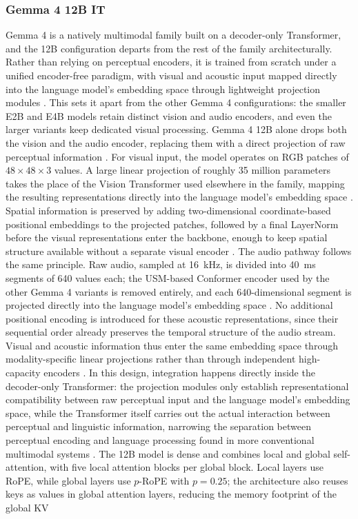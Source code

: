 \subsubsection*{Gemma 4 12B IT}
Gemma 4 is a natively multimodal family built on a decoder-only Transformer, and the 12B configuration departs from the rest of the family architecturally. Rather than relying on perceptual encoders, it is trained from scratch under a unified encoder-free paradigm, with visual and acoustic input mapped directly into the language model's embedding space through lightweight projection modules \cite{gemma4technicalreport}.
This sets it apart from the other Gemma 4 configurations: the smaller E2B and E4B models retain distinct vision and audio encoders, and even the larger variants keep dedicated visual processing. Gemma 4 12B alone drops both the vision and the audio encoder, replacing them with a direct projection of raw perceptual information \cite{gemma4technicalreport}.
For visual input, the model operates on RGB patches of $48 \times 48 \times 3$ values. A large linear projection of roughly 35 million parameters takes the place of the Vision Transformer used elsewhere in the family, mapping the resulting representations directly into the language model's embedding space \cite{gemma4technicalreport}. Spatial information is preserved by adding two-dimensional coordinate-based positional embeddings to the projected patches, followed by a final LayerNorm before the visual representations enter the backbone, enough to keep spatial structure available without a separate visual encoder \cite{gemma4technicalreport}.
The audio pathway follows the same principle. Raw audio, sampled at 16~kHz, is divided into 40~ms segments of 640 values each; the USM-based Conformer encoder used by the other Gemma 4 variants is removed entirely, and each 640-dimensional segment is projected directly into the language model's embedding space \cite{gemma4technicalreport}. No additional positional encoding is introduced for these acoustic representations, since their sequential order already preserves the temporal structure of the audio stream. Visual and acoustic information thus enter the same embedding space through modality-specific linear projections rather than through independent high-capacity encoders \cite{gemma4technicalreport}.
In this design, integration happens directly inside the decoder-only Transformer: the projection modules only establish representational compatibility between raw perceptual input and the language model's embedding space, while the Transformer itself carries out the actual interaction between perceptual and linguistic information, narrowing the separation between perceptual encoding and language processing found in more conventional multimodal systems \cite{gemma4technicalreport}.
The 12B model is dense and combines local and global self-attention, with five local attention blocks per global block. Local layers use RoPE, while global layers use $p$-RoPE with $p=0.25$; the architecture also reuses keys as values in global attention layers, reducing the memory footprint of the global KV

